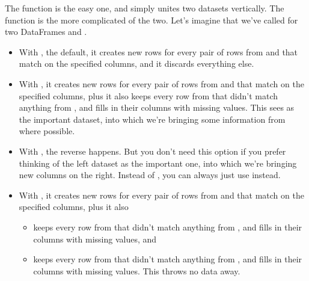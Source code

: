 \documentclass[letterpaper,10pt,english]{sphinxmanual}
\begin{document}
The  function is the easy one, and simply unites two datasets vertically.  The  function is the more complicated of the two.  Let’s imagine that we’ve called  for two DataFrames  and .
\begin{itemize}
\item {} 
With , the default, it creates new rows for every pair of rows from  and  that match on the specified columns, and it discards everything else.

\item {} 
With , it creates new rows for every pair of rows from  and  that match on the specified columns, plus it also keeps every row from  that didn’t match anything from , and fills in their  columns with missing values.  This sees  as the important dataset, into which we’re bringing some information from  where possible.

\item {} 
With , the reverse happens.  But you don’t need this option if you prefer thinking of the left dataset as the important one, into which we’re bringing new columns on the right.  Instead of , you can always just use  instead.

\item {} 
With , it creates new rows for every pair of rows from  and  that match on the specified columns, plus it also
\begin{itemize}
\item {} 
keeps every row from  that didn’t match anything from , and fills in their  columns with missing values, and

\item {} 
keeps every row from  that didn’t match anything from , and fills in their  columns with missing values.  This throws no data away.

\end{itemize}

\end{itemize}
\end{document}
